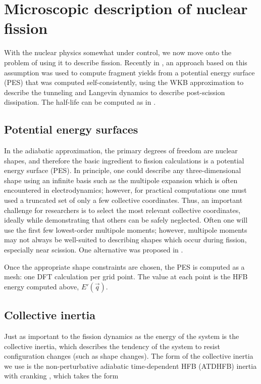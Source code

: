 \section{Microscopic description of nuclear fission}
With the nuclear physics somewhat under control, we now move onto the problem of using it to describe fission. Recently in \cite{Sadhukhan2016}, an approach based on this assumption was used to compute fragment yields from a potential energy surface (PES) that was computed self-consistently, using the WKB approximation to describe the tunneling and Langevin dynamics to describe post-scission dissipation. The half-life can be computed as in \cite{Sadhukhan2013}.

\subsection{Potential energy surfaces}
In the adiabatic approximation, the primary degrees of freedom are nuclear shapes, and therefore the basic ingredient to fission calculations is a potential energy surface (PES). In principle, one could describe any three-dimensional shape using an infinite basis such as the multipole expansion which is often encountered in electrodynamics; however, for practical computations one must used a truncated set of only a few collective coordinates. Thus, an important challenge for researchers is to select the most relevant collective coordinates, ideally while demonstrating that others can be safely neglected. Often one will use the first few lowest-order multipole moments; however, multipole moments may not always be well-suited to describing shapes which occur during fission, especially near scission. One alternative was proposed in \cite{Younes2012}.

Once the appropriate shape constraints are chosen, the PES is computed as a mesh: one DFT calculation per grid point. The value at each point is the HFB energy computed above, $E'(\vec{q})$.

\subsection{Collective inertia}
Just as important to the fission dynamics as the energy of the system is the collective inertia, which describes the tendency of the system to resist configuration changes (such as shape changes). The form of the collective inertia we use is the non-perturbative adiabatic time-dependent HFB (ATDHFB) inertia with cranking \cite{Baran2011}, which takes the form

